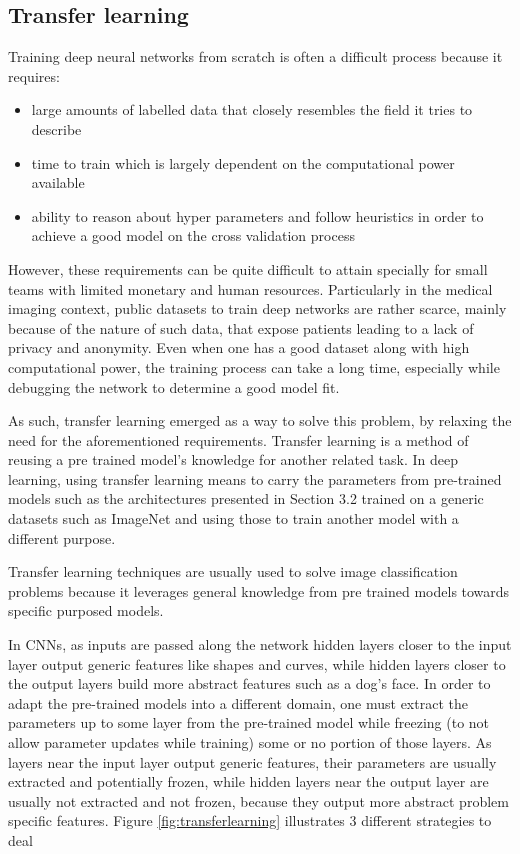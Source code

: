 \subsection{Transfer learning}
Training deep neural networks from scratch is often a difficult process because it requires:
\begin{itemize}
\item large amounts of labelled data that closely resembles the field it tries to describe 
\item time to train which is largely dependent on the computational power available 
\item ability to reason about hyper parameters and follow heuristics in order to achieve a good model on the cross validation process
\end{itemize}
However, these requirements can be quite difficult to attain specially for small teams with limited monetary and human resources. Particularly in the medical imaging context, public datasets to train deep networks are rather scarce, mainly because of the nature of such data, that expose patients leading to a lack of privacy and anonymity. 
Even when one has a good dataset along with high computational power, the training process can take a long time, especially while debugging the network to determine a good model fit. \par
As such, transfer learning emerged as a way to solve this problem, by  relaxing the need for the aforementioned requirements. Transfer learning is a method of reusing a pre trained model's knowledge for another related task\cite{DipanjanSarkarRaghavBali2018}. In deep learning, using transfer learning means to carry the parameters from pre-trained models such as the architectures presented in Section 3.2 trained on a generic datasets such as ImageNet and using those to train another model with a different purpose.\par Transfer learning techniques are usually used to solve image classification problems \cite{Ly2019} because it leverages general knowledge from pre trained models towards specific purposed models. \par
In \ac{CNN}s, as inputs are passed along the network hidden layers closer to the input layer output generic features like shapes and curves, while hidden layers closer to the output layers build more abstract features such as a dog's face. In order to adapt the pre-trained models into a different domain, one must extract the parameters up to some layer from the pre-trained model while freezing (to not allow parameter updates while training) some or no portion of those layers. As layers near the input layer output generic features, their parameters are usually extracted and potentially frozen, while hidden layers near the output layer are usually not extracted and not frozen, because they output more abstract problem specific features. Figure \ref{fig:transferlearning} illustrates 3 different strategies to deal 
